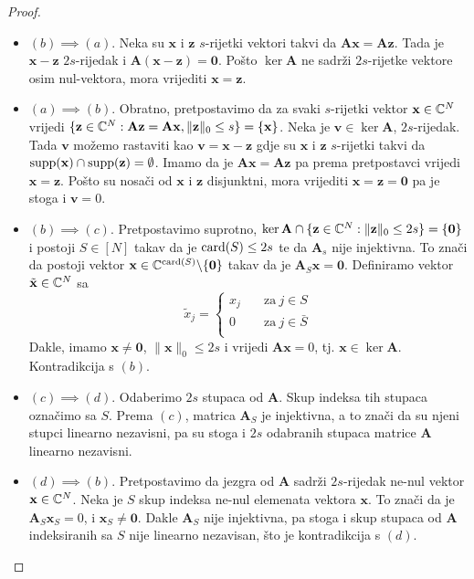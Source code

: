 \documentclass[a4paper,twoside,12pt]{memoir} %
\newcommand{\vect}[1]{\mathbf{#1}}
\renewcommand{\vec}{\vect}
\newcommand{\card}{\text{\normalfont{card}}}
\newcommand{\supp}{\text{\normalfont{supp}}}
\newcommand{\norm}[1]{\|{#1}\|}
\begin{document}
\begin{proof}
    \begin{itemize}
        \item[]$(b)\implies(a)$. Neka su $\vec x$ i $\vec z$ $s$-rijetki vektori takvi da $\vec{Ax} = \vec{Az}$. Tada je $\vec x - \vec z$ $2s$-rijedak i $\vec A(\vec x - \vec z) = \vec 0$. Po\v{s}to $\ker \vec A$ ne sadr\v{z}i $2s$-rijetke vektore osim nul-vektora, mora vrijediti $\vec x = \vec z$.
        \item[] $(a)\implies(b)$. Obratno, pretpostavimo da za svaki $s$-rijetki vektor $\vec x \in \C^N$ vrijedi $\{\vec z \in \C^N : \vec{Az} = \vec{Ax}, \norm{\vec z}_0 \leq s\} = \{\vec x\}$. Neka je $\vec v \in \ker \vec A$, $2s$-rijedak. Tada $\vec v$ mo\v{z}emo rastaviti kao $\vec v = \vec x - \vec z$ gdje su $\vec x$ i $\vec z$ $s$-rijetki takvi da $\supp(\vec x)\cap \supp(\vec z) = \emptyset$. Imamo da je $\vec{Ax}=\vec{Az}$ pa prema pretpostavci vrijedi $\vec{x}=\vec{z}$. Po\v{s}to su nosa\v{c}i od $\vec x$ i $\vec z$ disjunktni, mora vrijediti $\vec x = \vec z = \vec 0$ pa je stoga i $\vec v = 0$.
        \item[] $(b)\implies(c)$. Pretpostavimo suprotno, $\ker \vec A \cap \{\vec z \in \C^N: \norm{\vec z}_0 \leq 2s\} = \{\vec 0\}$ i postoji $S \in [N]$ takav da je $\card(S) \leq 2s$ te da $\vec A_s$ nije injektivna. To zna\v{c}i da postoji vektor $\vec x \in \C^{\card(S)} \backslash \{\vec 0\}$ takav da je $\vec A_S \vec x = \vec 0$. Definiramo vektor $\tilde{\vec{x}}\in \C^N$ sa 
            \begin{equation*}
                \tilde{x}_j = 
                \begin{cases}
                    x_j \quad & \text{za}\ j \in S \\
                    0 \quad & \text{za}\  j \in \bar S \\
                \end{cases}
            \end{equation*}
            Dakle, imamo $\vec x \neq \vec 0$, $\norm{\vec x}_0 \leq 2s$ i vrijedi $\vec{Ax}=0$, tj. $\vec x \in \ker \vec A$. Kontradikcija s $(b)$.
        \item[]$(c)\implies(d)$. Odaberimo $2s$  stupaca od $\vec A$. Skup indeksa tih stupaca ozna\v{c}imo sa $S$. Prema $(c)$, matrica $\vec A_S$ je injektivna, a to zna\v{c}i da su njeni stupci linearno nezavisni, pa su stoga i $2s$ odabranih stupaca matrice $\vec A$ linearno nezavisni.
        \item[]$(d)\implies(b)$. Pretpostavimo da jezgra od $\vec A$ sadr\v{z}i $2s$-rijedak ne-nul vektor $\vec x \in \C^N$. Neka je $S$ skup indeksa ne-nul elemenata vektora $\vec x$. To zna\v{c}i da je $\vec A_S \vec x_S = 0$, i $\vec x_S \neq \vec 0$. Dakle $\vec A_S$ nije injektivna, pa stoga i skup stupaca od $\vec A$ indeksiranih sa $S$ nije linearno nezavisan, \v{s}to je kontradikcija s $(d)$.
\end{itemize}
\end{proof}
\end{document}
